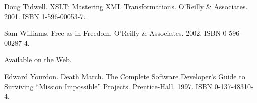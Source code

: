 \documentclass[12pt,oneside]{book}
\begin{document}
\begin{common-format}
\begin{thebibliography}{9}
%
%
 Doug Tidwell. XSLT: Mastering XML Transformations. O'Reilly \&{}  Associates. 2001. ISBN 1-596-00053-7.
%
%
%
%
%
%
%

 Sam Williams. Free as in Freedom. O'Reilly \&{} Associates. 2002. ISBN 0-596-00287-4.

\href{http://www.oreilly.com/openbook/freedom/index.html}{Available on the Web}.

 Edward Yourdon. Death March. The Complete Software Developer's Guide to Surviving “Mission Impossible” Projects. Prentice-Hall. 1997. ISBN 0-137-48310-4. 
\end{thebibliography}







\end{common-format}  
\end{document}
